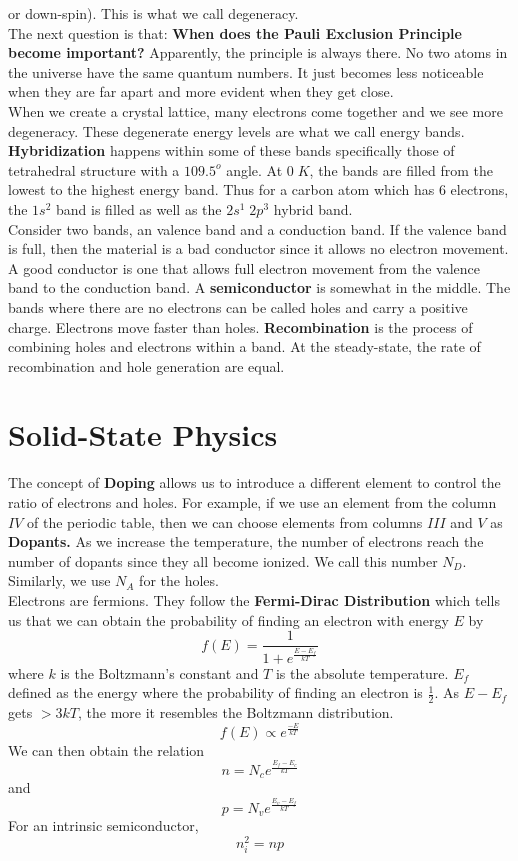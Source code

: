 \documentclass{article}
\begin{document}
or down-spin). This is what we call degeneracy.
\vspace{8pt}
\\The next question is that: \textbf{When does the Pauli Exclusion Principle become 
important?} Apparently, the principle is always there. No two atoms in the universe have 
the same quantum numbers. It just becomes less noticeable when they are far apart and
more evident when they get close. 
\vspace{8pt}
\\ When we create a crystal lattice, many electrons come together and we see more 
degeneracy. These degenerate energy levels are what we call energy bands. 
\textbf{Hybridization} happens within some of these bands specifically those of 
tetrahedral structure with a $109.5^{o}$ angle. At $0\;K$, the bands are filled from  
the lowest to the highest energy band. Thus for a carbon atom which has 6 electrons,
the $1s^2$ band is filled as well as the $2s^{1}\; 2p^{3}$ hybrid band. 
\vspace{8pt}
\\ Consider two bands, an valence band and a conduction band. If the valence band is full,
then the material is a bad conductor since it allows no electron movement. A good conductor 
is one that allows full electron movement from the valence band to the conduction band.
A \textbf{semiconductor} is somewhat in the middle. The bands where there are no 
electrons can be called holes and carry a positive charge. Electrons move faster than
holes. \textbf{Recombination} is the process of combining holes and electrons within
a band. At the steady-state, the rate of recombination and hole generation are equal.

\section{Solid-State Physics}
\noindent 
The concept of \textbf{Doping} allows us to introduce a different element to control 
the ratio of electrons and holes. For example, if we use an element from the column
$IV$ of the periodic table, then we can choose elements from columns $III$ and $V$ as
\textbf{Dopants.} As we increase the temperature, the number of electrons reach the 
number of dopants since they all become ionized. We call this number $N_D$. Similarly,
we use $N_A$ for the holes. 
\vspace{8pt}
\\ Electrons are fermions. They follow the \textbf{Fermi-Dirac Distribution} which 
tells us that we can obtain the probability of finding an electron with energy $E$ by
$$f(E) = \frac{1}{1+e^{\frac{E-E_{f}}{kT}}}$$ where $k$ is the Boltzmann's constant
and $T$ is the absolute temperature. $E_{f}$ defined as the energy where the probability
of finding an electron is $\frac{1}{2}$. As $E-E_{f}$ gets $>3kT$, the more it 
resembles the Boltzmann distribution. $$f(E) \propto{e^\frac{-E}{kT}}$$
We can then obtain the relation $$n = N_{c} e^\frac{E_f - E_c}{kT}$$ and 
$$p = N_{v} e^\frac{E_v - E_f}{kT}$$ 
For an intrinsic semiconductor, $$\boxed{n_{i}^2 = np}$$
\end{document}
